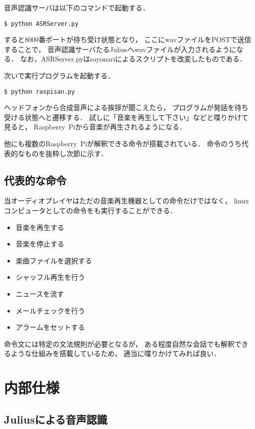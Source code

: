 \documentclass{jsarticle}
\begin{document}
\begin{multicols}{2}
音声認識サーバは以下のコマンドで起動する．
\begin{lstlisting}[caption=/bin/sh]
$ python ASRServer.py
\end{lstlisting}
すると8000番ポートが待ち受け状態となり，
ここにwavファイルをPOSTで送信することで，
音声認識サーバたるJuliusへwavファイルが入力されるようになる．
なお，ASRServer.pyはsayonariによるスクリプト\cite{sayonari}を改変したものである．

次いで実行プログラムを起動する．
\begin{lstlisting}[caption=/bin/sh]
$ python raspisan.py
\end{lstlisting}

ヘッドフォンから合成音声による挨拶が聞こえたら，
プログラムが発話を待ち受ける状態へと遷移する．
試しに「音楽を再生して下さい」などと喋りかけて見ると，
Raspberry\ Piから音楽が再生されるようになる．

他にも複数のRaspberry\ Piが解釈できる命令が搭載されている．
命令のうち代表的なものを抜粋し次節に示す．

\subsection{代表的な命令}

当オーディオプレイヤはただの音楽再生機器としての命令だけではなく，
linuxコンピュータとしての命令をも実行することができる．

\begin{itemize}
\item 音楽を再生する
\item 音楽を停止する
\item 楽曲ファイルを選択する
\item シャッフル再生を行う
\item ニュースを流す
\item メールチェックを行う
\item アラームをセットする
\end{itemize}

命令文には特定の文法規則が必要となるが，
ある程度自然な会話でも解釈できるような仕組みを搭載しているため，
適当に喋りかけてみれば良い．


\section{内部仕様}
\label{sec:内部仕様}
\label{内部仕様}

\subsection{Juliusによる音声認識}


\end{multicols}
\end{document}
